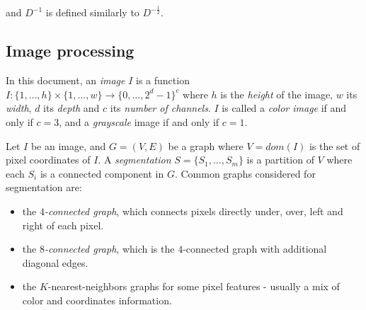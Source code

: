 and $D^{-1}$ is defined similarly to $D^{-\frac{1}{2}}$.

\subsection{Image processing}
\label{sec:imageProcessing}
In this document, an \emph{image} $I$ is a function $I : \{1, ..., h\} \times \{1, ..., w\} \rightarrow \{0, ..., 2^d - 1\}^c$ where $h$ is the \emph{height} of the image, $w$ its \emph{width}, $d$ its \emph{depth} and $c$ its \emph{number of channels}.  $I$ is called a \emph{color image} if and only if $c = 3$, and a \emph{grayscale} image if and only if $c = 1$.

Let $I$ be an image, and $G = (V,E)$ be a graph where $V = dom(I)$ is the set of pixel coordinates of $I$. A \emph{segmentation} $S = \{S_1, ..., S_m\}$ is a partition of $V$ where each $S_i$ is a connected component in $G$. Common graphs considered for segmentation are:

\begin{itemize}
\item the \emph{$4$-connected graph}, which connects pixels directly under, over, left and right of each pixel.
\item the \emph{$8$-connected graph}, which is the $4$-connected graph with additional diagonal edges.
\item the $K$-nearest-neighbors graphs for some pixel features - usually a mix of color and coordinates information.
\end{itemize}